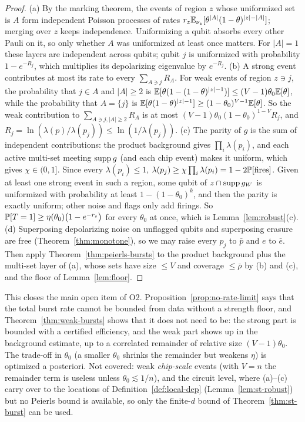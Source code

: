 \begin{proof}
(a) By the marking theorem, the events of region $z$ whose uniformized set is $A$ form independent Poisson processes of rates $r_z\mathbb{E}_{\nu_z}[\theta^{|A|}(1-\theta)^{|z|-|A|}]$; merging over $z$ keeps independence. Uniformizing a qubit absorbs every other Pauli on it, so only whether $A$ was uniformized at least once matters. For $|A|=1$ these layers are independent across qubits; qubit $j$ is uniformized with probability $1-e^{-R_j}$, which multiplies its depolarizing eigenvalue by $e^{-R_j}$.
(b) A strong event contributes at most its rate to every $\sum_{A\ni j}R_A$. For weak events of region $z\ni j$, the probability that $j\in A$ and $|A|\ge2$ is $\mathbb{E}[\theta(1-(1-\theta)^{|z|-1})]\le(V-1)\theta_0\mathbb{E}[\theta]$, while the probability that $A=\{j\}$ is $\mathbb{E}[\theta(1-\theta)^{|z|-1}]\ge(1-\theta_0)^{V-1}\mathbb{E}[\theta]$. So the weak contribution to $\sum_{A\ni j,|A|\ge2}R_A$ is at most $(V-1)\theta_0(1-\theta_0)^{1-V}R_j$, and $R_j=\ln(\lambda(p)/\lambda(p_j))\le\ln(1/\lambda(p_j))$.
(c) The parity of $g$ is the sum of independent contributions: the product background gives $\prod_i\lambda(p_i)$, and each active multi-set meeting $\operatorname{supp} g$ (and each chip event) makes it uniform, which gives $\chi\in(0,1]$. Since every $\lambda(p_i)\le1$, $\lambda(p_j)\ge\chi\prod_i\lambda(p_i)=1-2\mathbb{P}[\text{fires}]$. Given at least one strong event in such a region, some qubit of $z\cap\operatorname{supp} g_W$ is uniformized with probability at least $1-(1-\theta_0)^k$, and then the parity is exactly uniform; other noise and flags only add firings. So $\mathbb{P}[T=1]\ge\eta(\theta_0)\big(1-e^{-r_s}\big)$ for every $\theta_0$ at once, which is Lemma~\ref{lem:robust}(c).
(d) Superposing depolarizing noise on unflagged qubits and superposing erasure are free (Theorem~\ref{thm:monotone}), so we may raise every $p_j$ to $\bar p$ and $e$ to $\bar e$. Then apply Theorem~\ref{thm:peierls-bursts} to the product background plus the multi-set layer of (a), whose sets have size $\le V$ and coverage $\le\bar\rho$ by (b) and (c), and the floor of Lemma~\ref{lem:floor}.
\end{proof}

\noindent This closes the main open item of O2. Proposition~\ref{prop:no-rate-limit} says that the total burst rate cannot be bounded from data without a strength floor, and Theorem~\ref{thm:weak-bursts} shows that it does not need to be: the strong part is bounded with a certified efficiency, and the weak part shows up in the background estimate, up to a correlated remainder of relative size $(V-1)\theta_0$. The trade-off in $\theta_0$ (a smaller $\theta_0$ shrinks the remainder but weakens $\eta$) is optimized a posteriori. Not covered: weak \emph{chip-scale} events (with $V=n$ the remainder term is useless unless $\theta_0\lesssim1/n$), and the circuit level, where (a)--(c) carry over to the locations of Definition~\ref{def:local-dep} (Lemma~\ref{lem:st-robust}) but no Peierls bound is available, so only the finite-$d$ bound of Theorem~\ref{thm:st-burst} can be used.

